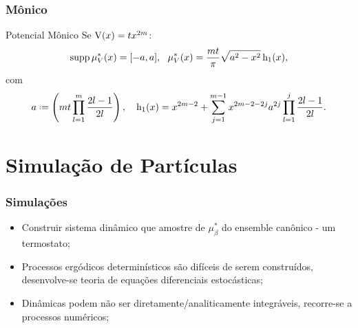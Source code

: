 \begin{frame}
	\frametitle{Mônico}

	
	\begin{block}{Potencial Mônico}
		Se $\operatorname{V}(x) = t x^{2m}$:
		\[
		\operatorname{supp} \mu^*_V(x) = [-a, a], \ \ \mu^*_V(x) = \frac{mt}{\pi} \sqrt{a^2 - x^2} \operatorname{h_1}(x),
		\]
		com $$ a \deff \left( mt \prod_{l=1}^{m} \frac{2l-1}{2l}\right), \ \ \ \h(x) = x^{2m-2} + \sum_{j=1}^{m-1} x^{2m-2-2j} a^{2j} \prod_{l=1}^{j} \frac{2l-1}{2l}.$$
	\end{block}	

	
\end{frame}


\section{Simulação de Partículas}

\begin{frame}
	\frametitle{Simulações}
	
	\begin{itemize}
		\item Construir sistema dinâmico que amostre de $\mu^*_{\beta}$ do ensemble canônico - um termostato;
		\pause
		\item Processos ergódicos determinísticos são difíceis de serem construídos, desenvolve-se teoria de equações diferenciais estocásticas;
		\pause
		\item Dinâmicas podem não ser diretamente/analiticamente integráveis, recorre-se a processos numéricos;
	\end{itemize}
\end{frame}

